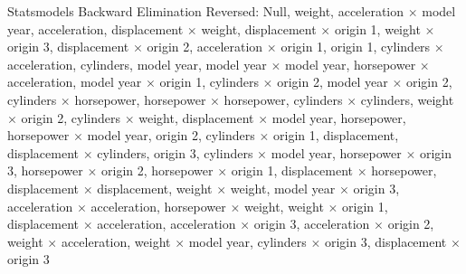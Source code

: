 \documentclass{article}
\begin{document}
Statsmodels Backward Elimination Reversed: Null, weight, acceleration $\times$ model year, acceleration, displacement $\times$ weight, displacement $\times$ origin 1, weight $\times$ origin 3, displacement $\times$ origin 2, acceleration $\times$ origin 1, origin 1, cylinders $\times$ acceleration, cylinders, model year, model year $\times$ model year, horsepower $\times$ acceleration, model year $\times$ origin 1, cylinders $\times$ origin 2, model year $\times$ origin 2, cylinders $\times$ horsepower, horsepower $\times$ horsepower, cylinders $\times$ cylinders, weight $\times$ origin 2, cylinders $\times$ weight, displacement $\times$ model year, horsepower, horsepower $\times$ model year, origin 2, cylinders $\times$ origin 1, displacement, displacement $\times$ cylinders, origin 3, cylinders $\times$ model year, horsepower $\times$ origin 3, horsepower $\times$ origin 2, horsepower $\times$ origin 1, displacement $\times$ horsepower, displacement $\times$ displacement, weight $\times$ weight, model year $\times$ origin 3, acceleration $\times$ acceleration, horsepower $\times$ weight, weight $\times$ origin 1, displacement $\times$ acceleration, acceleration $\times$ origin 3, acceleration $\times$ origin 2, weight $\times$ acceleration, weight $\times$ model year, cylinders $\times$ origin 3, displacement $\times$ origin 3
\end{document}
